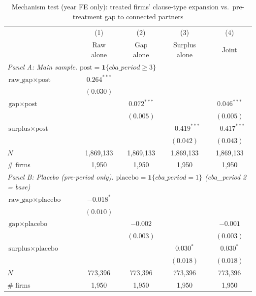 \begin{table}[H]
\centering
\caption{Mechanism test (year FE only): treated firms' clause-type expansion vs.\ pre-treatment gap to connected partners}
\label{tab:mechanism_test_yearonly}
\scriptsize
\begin{tabular}{lcccc}
\toprule\toprule
 & (1) & (2) & (3) & (4) \\
 & \shortstack{Raw \\ alone} & \shortstack{Gap \\ alone} & \shortstack{Surplus \\ alone} & Joint \\
\midrule
\multicolumn{5}{l}{\textit{Panel A: Main sample. $\text{post} = \mathbf{1}\{cba\_period \geq 3\}$}} \\
\midrule
$\text{raw\_gap} \times \text{post}$ & $0.264^{***}$ &  &  &  \\
 & $(0.030)$ &  &  &  \\
$\text{gap} \times \text{post}$ &  & $0.072^{***}$ &  & $0.046^{***}$ \\
 &  & $(0.005)$ &  & $(0.005)$ \\
$\text{surplus} \times \text{post}$ &  &  & $-0.419^{***}$ & $-0.417^{***}$ \\
 &  &  & $(0.042)$ & $(0.043)$ \\
$N$ & 1,869,133 & 1,869,133 & 1,869,133 & 1,869,133 \\
\# firms & 1,950 & 1,950 & 1,950 & 1,950 \\
\midrule
\multicolumn{5}{l}{\textit{Panel B: Placebo (pre-period only). $\text{placebo} = \mathbf{1}\{cba\_period = 1\}$ (cba\_period 2 = base)}} \\
\midrule
$\text{raw\_gap} \times \text{placebo}$ & $-0.018^{*}$ &  &  &  \\
 & $(0.010)$ &  &  &  \\
$\text{gap} \times \text{placebo}$ &  & $-0.002$ &  & $-0.001$ \\
 &  & $(0.003)$ &  & $(0.003)$ \\
$\text{surplus} \times \text{placebo}$ &  &  & $0.030^{*}$ & $0.030^{*}$ \\
 &  &  & $(0.018)$ & $(0.018)$ \\
$N$ & 773,396 & 773,396 & 773,396 & 773,396 \\
\# firms & 1,950 & 1,950 & 1,950 & 1,950 \\
\bottomrule
\end{tabular}
\begin{minipage}{\linewidth}
\footnotesize\vspace{4pt}

\end{minipage}
\end{table}
